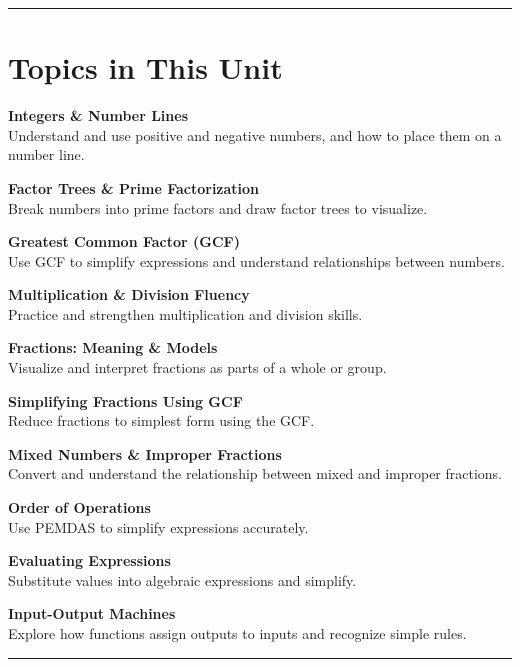 \documentclass[
  letterpaper,
]{scrrept}
\begin{document}
\begin{center}\rule{0.5\linewidth}{0.5pt}\end{center}

\section*{Topics in This Unit}\label{topics-in-this-unit}


\textbf{Integers \& Number Lines}\\
Understand and use positive and negative numbers, and how to place them
on a number line.

\textbf{Factor Trees \& Prime Factorization}\\
Break numbers into prime factors and draw factor trees to visualize.

\textbf{Greatest Common Factor (GCF)}\\
Use GCF to simplify expressions and understand relationships between
numbers.

\textbf{Multiplication \& Division Fluency}\\
Practice and strengthen multiplication and division skills.

\textbf{Fractions: Meaning \& Models}\\
Visualize and interpret fractions as parts of a whole or group.

\textbf{Simplifying Fractions Using GCF}\\
Reduce fractions to simplest form using the GCF.

\textbf{Mixed Numbers \& Improper Fractions}\\
Convert and understand the relationship between mixed and improper
fractions.

\textbf{Order of Operations}\\
Use PEMDAS to simplify expressions accurately.

\textbf{Evaluating Expressions}\\
Substitute values into algebraic expressions and simplify.

\textbf{Input-Output Machines}\\
Explore how functions assign outputs to inputs and recognize simple
rules.

\begin{center}\rule{0.5\linewidth}{0.5pt}\end{center}
\end{document}

